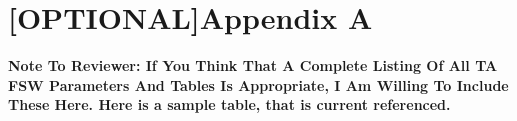\documentclass{stsci_report}
\begin{document}
\section{[OPTIONAL]Appendix A}\label{sec:Appendix}
{\bf Note To Reviewer: If You Think That A Complete Listing Of All TA FSW Parameters And Tables Is Appropriate, I Am Willing To Include These Here.
Here is a sample table, that is current referenced.}

%
\end{document}
